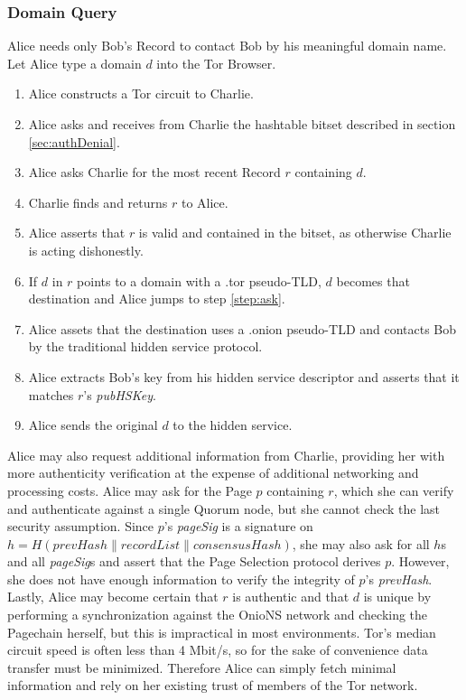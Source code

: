 \documentclass{sig-alternate}
\newcommand*\concat{\mathbin{\|}}
\begin{document}
\subsubsection{Domain Query}

Alice needs only Bob's Record to contact Bob by his meaningful domain name. Let Alice type a domain $ d $ into the Tor Browser.

\begin{enumerate}
	\item Alice constructs a Tor circuit to Charlie.
	\item Alice asks and receives from Charlie the hashtable bitset described in section \ref{sec:authDenial}.
	\item \label{step:ask} Alice asks Charlie for the most recent Record $ r $ containing $ d $.
	\item Charlie finds and returns $ r $ to Alice.
	\item Alice asserts that $ r $ is valid and contained in the bitset, as otherwise Charlie is acting dishonestly.
	\item If $ d $ in $ r $ points to a domain with a .tor pseudo-TLD, $ d $ becomes that destination and Alice jumps to step \ref{step:ask}.
	\item Alice assets that the destination uses a .onion pseudo-TLD and contacts Bob by the traditional hidden service protocol.
	\item Alice extracts Bob's key from his hidden service descriptor and asserts that it matches $ r $'s \emph{pubHSKey}.
	\item Alice sends the original $ d $ to the hidden service.
\end{enumerate}

Alice may also request additional information from Charlie, providing her with more authenticity verification at the expense of additional networking and processing costs. Alice may ask for the Page $ p $ containing $ r $, which she can verify and authenticate against a single Quorum node, but she cannot check the last security assumption. Since $ p $'s \emph{pageSig} is a signature on $ h = H(\mathit{prevHash} \concat \mathit{recordList} \concat \mathit{consensusHash}) $, she may also ask for all $ h $s and all \emph{pageSig}s and assert that the Page Selection protocol derives $ p $. However, she does not have enough information to verify the integrity of $ p $'s \emph{prevHash}. Lastly, Alice may become certain that $ r $ is authentic and that $ d $ is unique by performing a synchronization against the OnioNS network and checking the Pagechain herself, but this is impractical in most environments. Tor's median circuit speed is often less than 4 Mbit/s,\cite{TorMetrics} so for the sake of convenience data transfer must be minimized. Therefore Alice can simply fetch minimal information and rely on her existing trust of members of the Tor network.
\end{document}
